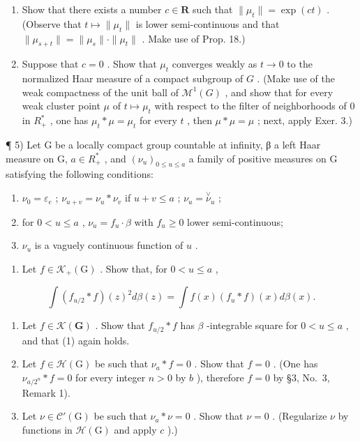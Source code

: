 \begin{enumerate}
\def\labelenumi{\alph{enumi})}
\item
  Show that there exists a number \(c \in \mathbf{R}\) such that \(\| \mu_t \| = \exp(ct)\) . (Observe that \(t \mapsto \| \mu_t \|\) is lower semi-continuous and that \(\| \mu_{s+t} \| = \| \mu_s \| \cdot \| \mu_t \|\) . Make use of Prop. 18.)
\item
  Suppose that \(c = 0\) . Show that \(\mu_t\) converges weakly as \(t \to 0\) to the normalized Haar measure of a compact subgroup of \(G\) . (Make use of the weak compactness of the unit ball of \(\mathcal{M}^1(G)\) , and show that for every weak cluster point \(\mu\) of \(t \mapsto \mu_t\) with respect to the filter of neighborhoods of 0 in \(R_+^*\) , one has \(\mu_t * \mu = \mu_t\) for every \(t\) , then \(\mu * \mu = \mu\) ; next, apply Exer. 3.)
\end{enumerate}

¶ 5) Let G be a locally compact group countable at infinity, β a left Haar measure on G, \(a \in R_{+}^{*}\) , and \((\nu_{u})_{0 \leqslant u \leqslant a}\) a family of positive measures on G satisfying the following conditions:

\begin{enumerate}
\def\labelenumi{(\roman{enumi})}
\item
  \(\nu_0 = \varepsilon_e\) ; \(\nu_{u + v} = \nu_u * \nu_v\) if \(u + v \leqslant a\) ; \(\nu_u = \stackrel{\vee}{\nu}_u\) ;
\item
  for \(0 < u \leqslant a\) , \(\nu_{u} = f_{u} \cdot \beta\) with \(f_{u} \geqslant 0\) lower semi-continuous;
\item
  \(\nu_{u}\) is a vaguely continuous function of \(u\) .
\end{enumerate}

\begin{enumerate}
\def\labelenumi{\alph{enumi})}
\tightlist
\item
  Let \(f \in \mathcal{K}_{+}(\mathrm{G})\) . Show that, for \(0 < u \leqslant a\) ,
\end{enumerate}

\[
\int \left(f _ {u / 2} * f\right) (z) ^ {2} d \beta (z) = \int f (x) \left(f _ {u} * f\right) (x) d \beta (x).\tag{1}
\]

\begin{enumerate}
\def\labelenumi{\alph{enumi})}
\setcounter{enumi}{1}
\item
  Let \(f \in \mathcal{K}(\mathbf{G})\) . Show that \(f_{u/2} * f\) has \(\beta\) -integrable square for \(0 < u \leqslant a\) , and that (1) again holds.
\item
  Let \(f \in \mathcal{H}(\mathrm{G})\) be such that \(\nu_{a} * f = 0\) . Show that \(f = 0\) . (One has \(\nu_{a/2^n} * f = 0\) for every integer \(n > 0\) by \(b\) ), therefore \(f = 0\) by §3, No.~3, Remark 1).
\item
  Let \(\nu \in \mathcal{C}'(\mathrm{G})\) be such that \(\nu_{a} * \nu = 0\) . Show that \(\nu = 0\) . (Regularize \(\nu\) by functions in \(\mathcal{H}(\mathrm{G})\) and apply \(c\) ).)
\end{enumerate}


